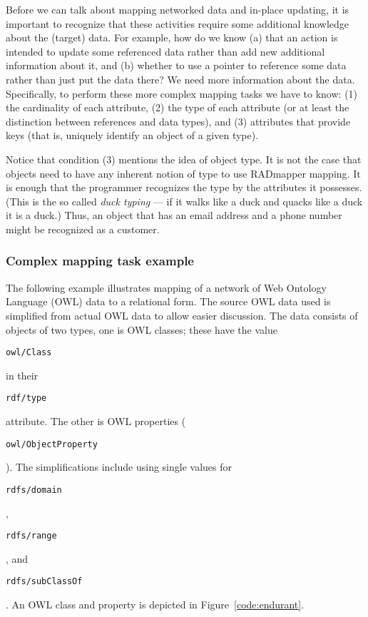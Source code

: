 \documentclass[9pt,letterpaper]{article}
\newcommand{\stt}[1]{\begin{footnotesize}\texttt{#1}\end{footnotesize}}
\begin{document}
Before we can talk about mapping networked data and in-place updating, it is important to recognize that these activities require
some additional knowledge about the (target) data.
For example, how do we know
(a) that an action is intended to update some referenced data rather than add new additional information about it, and
(b) whether to use a pointer to reference some data rather than just put the data there?
We need more information about the data.
Specifically, to perform these more complex mapping tasks we have to know:
(1) the cardinality of each attribute,
(2) the type of each attribute (or at least the distinction between references and data types), and
(3) attributes that provide keys (that is, uniquely identify an object of a given type).

Notice that condition (3) mentions the idea of object type.
It is not the case that objects need to have any inherent notion of type to use RADmapper mapping.
It is enough that the programmer recognizes the type by the attributes it possesses.
(This is the so called \textit{duck typing} --- if it walks like a duck and quacks like a duck it is a duck.)
Thus, an object that has an email address and a phone number might be recognized as a customer.

\subsubsection{Complex mapping task example}

The following example illustrates mapping of a network of Web Ontology Language (OWL) data to a relational form.
The source OWL data used is simplified from actual OWL data to allow easier discussion.
The data consists of objects of two types, one is OWL classes; these have the value  \stt{owl/Class} in their \stt{rdf/type} attribute.
The other is OWL properties (\stt{owl/ObjectProperty}).
The simplifications include using single values for \stt{rdfs/domain}, \stt{rdfs/range}, and \stt{rdfs/subClassOf}.
An OWL class and property is depicted in Figure~\ref{code:endurant}.
\end{document}
